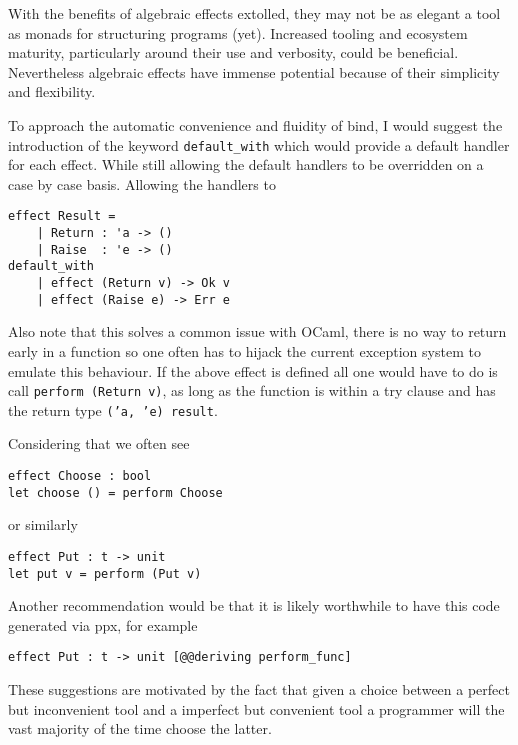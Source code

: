 With the benefits of algebraic effects extolled,
they may not be as elegant a tool as monads for structuring programs (yet).
Increased tooling and ecosystem maturity,
particularly around their use and verbosity,
could be beneficial.
Nevertheless algebraic effects
have immense potential because of
their simplicity and flexibility.

To approach the automatic convenience and fluidity of bind,
I would suggest the introduction of the keyword
\texttt{default\_with} which would provide a default
handler for each effect. While still
allowing the default handlers to be overridden
on a case by case basis.
Allowing the handlers to 
\begin{verbatim}
effect Result =
    | Return : 'a -> ()
    | Raise  : 'e -> ()
default_with
    | effect (Return v) -> Ok v
    | effect (Raise e) -> Err e
\end{verbatim}
Also note that this solves a common issue with
OCaml, there is no way to return early in a function
so one often has to hijack the current exception
system to emulate this behaviour.
If the above effect is defined all one would have
to do is call \texttt{perform (Return v)},
as long as the function is within a try clause and has
the return type \texttt{('a, 'e) result}.

Considering that we often see
\begin{verbatim}
effect Choose : bool
let choose () = perform Choose\end{verbatim}
or similarly
\begin{verbatim}
effect Put : t -> unit
let put v = perform (Put v)
\end{verbatim}
Another recommendation would be that it is likely
worthwhile to have this code generated via ppx, for example
\begin{verbatim}
effect Put : t -> unit [@@deriving perform_func]
\end{verbatim}

These suggestions are motivated by the fact that
given a choice between a perfect but inconvenient tool
and a imperfect but convenient tool
a programmer will the vast majority of the time choose the latter.
